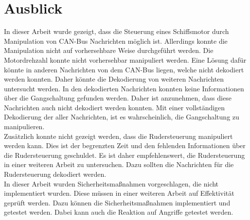 \section{Ausblick}
In dieser Arbeit wurde gezeigt, dass die Steuerung eines Schiffsmotor durch Manipulation von CAN-Bus Nachrichten möglich ist.
Allerdings konnte die Manipulation nicht auf vorhersehbare Weise durchgeführt werden. Die Motordrehzahl konnte nicht
vorhersehbar manipuliert werden. Eine Lösung dafür könnte in anderen Nachrichten von dem CAN-Bus liegen, welche nicht
dekodiert werden konnten. Daher könnte die Dekodierung von weiteren Nachrichten untersucht werden.
In den dekodierten Nachrichten konnten keine Informationen über die Gangschaltung gefunden werden. Daher ist anzunehmen,
dass diese Nachrichten auch nicht dekodiert werden konnten. Mit einer vollständigen Dekodierung der aller Nachrichten,
ist es wahrscheinlich, die Gangschaltung zu manipulieren. \\
Zusätzlich konnte nicht gezeigt werden, dass die Rudersteuerung manipuliert werden kann. Dies ist der begrenzten Zeit
und den fehlenden Informationen über die Rudersteuerung geschuldet. Es ist daher empfehlenswert, die Rudersteuerung
in einer weiteren Arbeit zu untersuchen. Dazu sollten die Nachrichten für die Rudersteuerung dekodiert werden. \\
In dieser Arbeit wurden Sicherheitsmaßnahmen vorgeschlagen, die nicht implementiert wurden. Diese müssen in einer weiteren
Arbeit auf Effektivität geprüft werden. Dazu können die Sicherheitsmaßnahmen implementiert und getestet werden.
Dabei kann auch die Reaktion auf Angriffe getestet werden. \\
